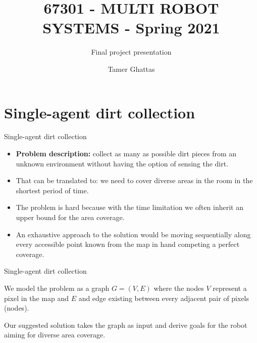 \documentclass[10pt]{beamer}
\title{67301 - MULTI ROBOT SYSTEMS - Spring 2021}
\subtitle{Final project presentation}
\date{}
\author{Tamer Ghattas}
\institute{
The Hebrew University of Jerusalem School of Computer Science and Engineering
}
\begin{document}
\maketitle


\section{Single-agent dirt collection}

\begin{frame}{Single-agent dirt collection}
\begin{itemize}
    \item {\bf Problem description:} collect as many as possible dirt pieces from an unknown environment without having the option of sensing the dirt. 
    \item That can be translated to: we need to cover diverse areas in the room in the shortest period of time.
    \item The problem is hard because with the time limitation we often inherit an upper bound for the area coverage.
    \item An exhaustive approach to the solution would be moving sequentially along every accessible point known from the map in hand competing a perfect coverage.
\end{itemize}
\end{frame}


\begin{frame}{Single-agent dirt collection}

We model the problem as a graph $G=(V, E)$ where the nodes $V$ represent a pixel in the map and $E$ and edge existing between every adjacent pair of pixels (nodes).


\bigskip


Our suggested solution takes the graph as input and derive goals for the robot aiming for diverse area coverage.
\end{frame}
\end{document}
